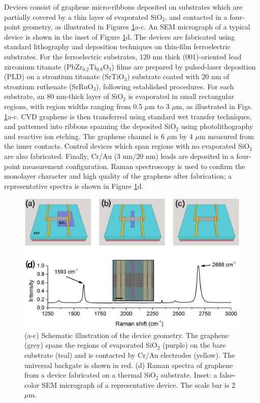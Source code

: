 \documentclass[edeposit,fullpage,draftthesis]{uiucthesis2009}
\begin{document}
        Devices consist of graphene micro-ribbons deposited on substrates which are partially covered by a thin layer of evaporated SiO$_2$, and contacted in a four-point geometry, as illustrated in Figures \ref{fig:devices}a-c. An SEM micrograph of a typical device is shown in the inset of Figure \ref{fig:devices}d. The devices are fabricated using standard lithography and deposition techniques on thin-film ferroelectric substrates. For the ferroelectric substrates, 120 nm thick (001)-oriented lead zirconium titanate (PbZr$_{0.2}$Ti$_{0.8}$O$_3$) films are prepared by pulsed-laser deposition (PLD) on a strontium titanate (SrTiO$_3$) substrate coated with 20 nm of strontium ruthenate (SrRuO$_3$), following established procedures\cite{Xu2014,Karthik2012}. For each substrate, an 80 nm-thick layer of SiO$_2$ is evaporated in small rectangular regions, with region widths ranging from 0.5 $\mu$m to 3 $\mu$m, as illustrated in Figs. \ref{fig:devices}a-c. CVD graphene is then transferred using standard wet transfer techniques\cite{Li2009}, and patterned into ribbons spanning the deposited SiO$_2$ using photolithography and reactive ion etching. The graphene channel is 6 $\mu$m by 4 $\mu$m measured from the inner contacts. Control devices which span regions with no evaporated SiO$_2$ are also fabricated. Finally, Cr/Au (3 nm/20 nm) leads are deposited in a four-point measurement configuration.  Raman spectroscopy is used to confirm the monolayer character and high quality of the graphene after fabrication; a representative spectra is shown in Figure \ref{fig:devices}d.

\begin{figure}
  \centering
  \includegraphics[width=.8\textwidth]{images/resultsanddiscussion/pztpaper/figure1}
  \caption[Schematic illustration of graphene-ferroelectric pn junction device geometry]{
   (a-c) Schematic illustration of the device geometry. The graphene (grey) spans the regions of evaporated SiO$_2$ (purple) on the bare substrate (teal) and is contacted by Cr/Au electrodes (yellow). The universal backgate is shown in red.
   (d) Raman spectra of graphene from a device fabricated on a thermal SiO$_2$ substrate. %
   Inset: a false-color SEM micrograph of a representative device. The scale bar is 2 $\mu$m.
  }
  \label{fig:devices}
\end{figure}
\end{document}
